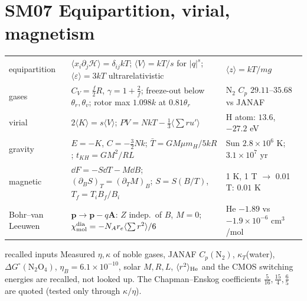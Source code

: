 \documentclass[9pt]{article}
\begin{document}
\section*{SM07 Equipartition, virial, magnetism}
\begin{tabular}{@{}p{2.9cm}p{8.9cm}p{5.6cm}@{}}
\toprule
equipartition & $\langle x_i\partial_j\mathcal H\rangle=\delta_{ij}kT$; $\langle V\rangle=kT/s$ for $|q|^s$; $\langle\varepsilon\rangle=3kT$ ultrarelativistic & $\langle z\rangle=kT/mg$\\
gases & $C_V=\tfrac f2R$, $\gamma=1+\tfrac2f$; freeze-out below $\theta_r,\theta_v$; rotor max $1.098k$ at $0.81\theta_r$ & N$_2$ $C_p$ $29.11$--$35.68$ vs JANAF\\
virial & $2\langle K\rangle=s\langle V\rangle$; $PV=NkT-\tfrac13\langle\sum ru'\rangle$ & H atom: $13.6$, $-27.2$ eV\\
gravity & $E=-K$, $C=-\tfrac32Nk$; $\bar T=GM\mu m_H/5kR$; $t_{KH}=GM^2/RL$ & Sun $2.8\times10^6$ K; $3.1\times10^7$ yr\\
magnetic & $\dd F=-S\dd T-M\dd B$; $(\partial_BS)_T=(\partial_TM)_B$; $S=S(B/T)$, $T_f=T_iB_f/B_i$ & 1 K, 1 T $\to$ 0.01 T: $0.01$ K\\
Bohr--van Leeuwen & $\mathbf p\to\mathbf p-q\mathbf A$: $Z$ indep.\ of $B$, $M=0$; $\chi_{\rm mol}^{\rm dia}=-N_Ar_e\langle\sum r^2\rangle/6$ & He $-1.89$ vs $-1.9\times10^{-6}$ cm$^3$/mol\\
\bottomrule
\end{tabular}

\vspace{3pt}
\begin{verifybox}{recalled inputs}
Measured $\eta,\kappa$ of noble gases, JANAF $C_p(\mathrm N_2)$, $\kappa_T$(water), $\Delta G^\circ(\mathrm N_2\mathrm O_4)$, $\eta_B=6.1\times10^{-10}$, solar $M,R,L$, $\langle r^2\rangle_{\rm He}$ and the CMOS switching energies are recalled, not looked up. The Chapman--Enskog coefficients $\tfrac5{16},\tfrac{15}4,\tfrac65$ are quoted (tested only through $\kappa/\eta$).
\end{verifybox}
\end{document}
